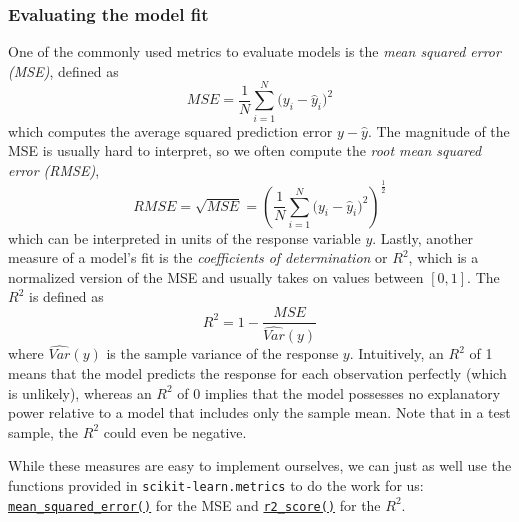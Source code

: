 \documentclass{scrartcl}
\begin{document}
    \hypertarget{evaluating-the-model-fit}{%
\subsubsection{Evaluating the model
fit}\label{evaluating-the-model-fit}}

One of the commonly used metrics to evaluate models is the \emph{mean
squared error (MSE)}, defined as \[
MSE = \frac{1}{N} \sum_{i=1}^N \bigl(y_i - \widehat{y}_i\bigr)^2
\] which computes the average squared prediction error
\(y - \widehat{y}\). The magnitude of the MSE is usually hard to
interpret, so we often compute the \emph{root mean squared error
(RMSE)}, \[
RMSE = \sqrt{MSE} = \left(\frac{1}{N} \sum_{i=1}^N \bigl(y_i - \widehat{y}_i\bigr)^2 \right)^{\frac{1}{2}}
\] which can be interpreted in units of the response variable \(y\).
Lastly, another measure of a model's fit is the \emph{coefficients of
determination} or \(R^2\), which is a normalized version of the MSE and
usually takes on values between \([0,1]\). The \(R^2\) is defined as \[
R^2 = 1 - \frac{MSE}{\widehat{Var}(y)}
\] where \(\widehat{Var}(y)\) is the sample variance of the response
\(y\). Intuitively, an \(R^2\) of 1 means that the model predicts the
response for each observation perfectly (which is unlikely), whereas an
\(R^2\) of 0 implies that the model possesses no explanatory power
relative to a model that includes only the sample mean. Note that in a
test sample, the \(R^2\) could even be negative.

    While these measures are easy to implement ourselves, we can just as
well use the functions provided in \texttt{scikit-learn.metrics} to do
the work for us:
\href{https://scikit-learn.org/stable/modules/generated/sklearn.metrics.mean_squared_error.html\#sklearn.metrics.mean_squared_error}{\texttt{mean\_squared\_error()}}
for the MSE and
\href{https://scikit-learn.org/stable/modules/generated/sklearn.metrics.r2_score.html\#sklearn.metrics.r2_score}{\texttt{r2\_score()}}
for the \(R^2\).
\end{document}
